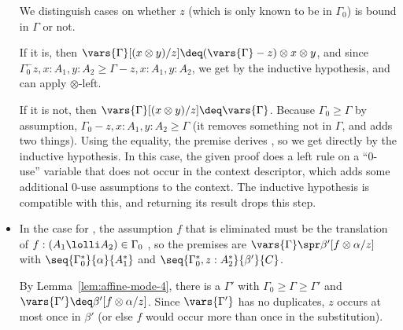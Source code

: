 \begin{itemize}
  We distinguish cases on whether $z$ (which is only known to be in
  $\Gamma_0$) is bound in $\Gamma$ or not.  

  If it is, then $\vars{\Gamma}[(x \otimes y)/z] \deq
  (\vars{\Gamma}-z)\otimes x \otimes y$, and since
  $\Gamma_0^-z,x:A_1,y:A_2 \ge \Gamma-z,x:A_1,y:A_2$, we get
   by the inductive hypothesis, and can
  apply $\otimes$-left.

  If it is not, then $\vars{\Gamma}[(x \otimes y)/z] \deq
  \vars{\Gamma}$.  Because $\Gamma_0 \ge \Gamma$ by assumption,
  ${\Gamma_0-z,x:A_1,y:A_2} \ge \Gamma$ (it removes something not in
  $\Gamma$, and adds two things).  Using the equality, the premise derives
  ,
  so we get  directly by the inductive hypothesis.  
  In this case, the given proof does a left rule on a ``0-use''
  variable that does not occur in the context descriptor, which adds
  some additional 0-use assumptions to the context.  The inductive
  hypothesis is compatible with this, and returning its result
  drops this step.    

\item In the case for \UL, the assumption $f$ that is eliminated must be
  the translation of $f:(A_1 \lolli A_2) \in \Gamma_0$ , so the premises
  are $\vars{\Gamma} \spr \beta'[f \otimes \alpha/z]$ with
  $\seq{\Gamma_0^*}{\alpha}{A_1^*}$ and
  $\seq{\Gamma_0^*,z:A_2^*}{\beta'}{C}$.

  By Lemma~\ref{lem:affine-mode-4}, there is a $\Gamma'$ with $\Gamma_0
  \ge \Gamma \ge \Gamma'$ and $\vars{\Gamma'} \deq \beta'[f \otimes
    \alpha/z]$.  Since $\vars{\Gamma'}$ has no duplicates, $z$ occurs at
  most once in $\beta'$ (or else $f$ would occur more than once in the
  substitution).
  


\end{itemize}
